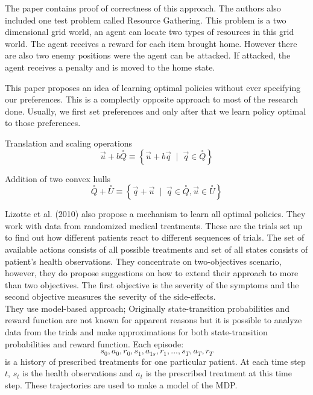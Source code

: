The paper contains proof of correctness of this approach. The authors also included one test problem called Resource Gathering. This problem is a two dimensional grid world, an agent can locate two types of resources in this grid world. The agent receives a reward for each item brought home. However there are also two enemy positions were the agent can be attacked. If attacked, the agent receives a penalty and is moved to the home state.

This paper proposes an idea of learning optimal policies without ever specifying our preferences. This is a complectly opposite approach to most of the research done. Usually, we first set preferences and only after that we learn policy optimal to those preferences.


Translation and scaling operations
$$ \vec{u}+b\overset{\circ}{Q}  \equiv \left\{ \vec{u} + b\vec{q} \;\;|\;\; \vec{q} \in \overset{\circ}{Q} \right\} $$

Addition of two convex hulls
$$ \overset{\circ}{Q} + \overset{\circ}{U} \equiv \left\{ \vec{q} + \vec{u} \;\;|\;\; \vec{q} \in \overset{\circ}{Q},\vec{u} \in \overset{\circ}{U} \right\} $$



Lizotte et al. (2010) \nocite{lizotte2010efficient} also propose a mechanism to learn all optimal policies. They work with data from randomized medical treatments. These are the trials set up to find out how different patients react to different sequences of trials. The set of available actions consists of all possible treatments and set of all states consists of patient's health observations. They concentrate on two-objectives scenario, however, they do propose suggestions on how to extend their approach to more than two objectives. The first objective is the severity of the symptoms and the second objective measures the severity of the side-effects. \\

They use model-based approach; Originally state-transition probabilities and reward function are not known for apparent reasons but it is possible to analyze data from the trials and make approximations for both state-transition probabilities and reward function. Each episode:
$$ s_{0},a_{0},r_{0},s_{1},a_{1s},r_{1}, ... , s_{T},a_{T},r_{T} $$
is a history of prescribed treatments for one particular patient. At each time step $t$, $s_{t}$ is the health observations and $a_{t}$ is the prescribed treatment at this time step. These trajectories are used to make a model of the MDP. \\

